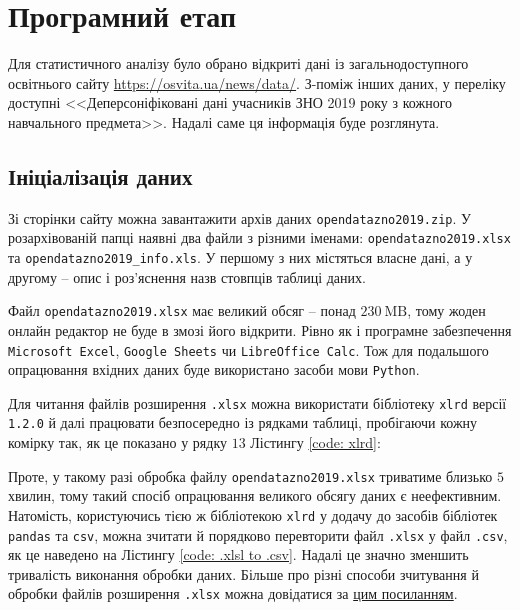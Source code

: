 \section*{Програмний етап}

Для статистичного аналізу було обрано відкриті дані із загальнодоступного освітнього сайту 
\url{https://osvita.ua/news/data/}. З-поміж інших даних, у переліку доступні <<Деперсоніфіковані дані 
учасників ЗНО 2019 року з кожного навчального предмета>>. Надалі саме ця інформація буде розглянута. 

\subsection*{Ініціалізація даних}

Зі сторінки сайту можна завантажити архів даних \texttt{opendatazno2019.zip}. У роз\-архівованій папці 
наявні два файли з різними іменами: \texttt{opendatazno2019.xlsx} та \texttt{opendatazno2019\_info.xls}. У першому з них містяться 
власне дані, а у другому -- опис і роз'яснення назв стовпців таблиці даних.  

Файл \texttt{opendatazno2019.xlsx} має великий обсяг -- понад $230\ \text{MB}$, тому жоден онлайн редактор не 
буде в змозі його відкрити. Рівно як і програмне забезпечення \texttt{Microsoft Excel}, \texttt{Google Sheets} 
чи \texttt{LibreOffice Calc}. Тож для подальшого опрацювання вхідних даних буде використано засоби мови \texttt{Python}. 

Для читання файлів розширення \texttt{.xlsx} можна використати бібліотеку \texttt{xlrd} версії \texttt{1.2.0} 
й далі працювати безпосередно із рядками таблиці, пробігаючи кожну комірку так, як це показано у рядку $13$ 
Лістингу  \ref{code: xlrd}: 



\vspace{0.4cm}
Проте, у такому разі обробка файлу \texttt{opendatazno2019.xlsx} триватиме близько $5$ хвилин, тому такий 
спосіб опрацювання великого обсягу даних є неефективним. Натомість, користуючись тією ж бібліотекою 
\texttt{xlrd} у додачу до засобів бібліотек \texttt{pandas} та \texttt{csv}, можна зчитати й порядково 
перевторити файл \texttt{.xlsx} у файл \texttt{.csv}, як це наведено на Лістингу \ref{code: .xlsl to .csv}. 
Надалі це значно зменшить тривалість виконання обробки даних. Більше про різні способи зчитування й обробки 
файлів розширення \texttt{.xlsx} можна довідатися за 
\href{https://linuxhint.com/read-excel-file-python/}{цим посиланням}.

